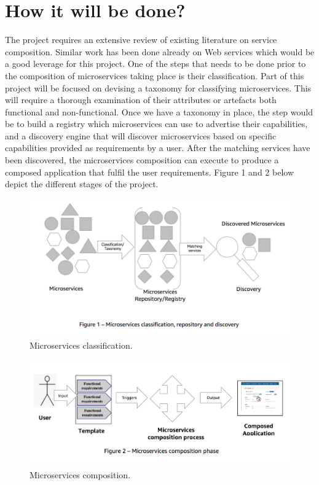 \documentclass{article}
\begin{document}
\section{How it will be done?}

The project requires an extensive review of existing literature on service composition. Similar work has been done already on Web services which would be a good leverage for this project. One of the steps that needs to be done prior to the composition of microservices taking place is their classification. Part of this project will be focused on devising a taxonomy for classifying microservices. This will require a thorough examination of their attributes or artefacts both functional and non-functional. Once we have a taxonomy in place, the step would be to build a registry which microservices can use to advertise their capabilities, and a discovery engine that will discover microservices based on specific capabilities provided as requirements by a user. After the matching services have been discovered, the microservices composition can execute to produce a composed application that fulfil the user requirements. Figure 1 and 2 below depict the different stages of the project.

\begin{figure}[!ht]
\includegraphics{microservices_classification.png}
\caption{Microservices classification.}
\end{figure}

\begin{figure}[!ht]
\includegraphics{microservices_composition.png}
\caption{Microservices composition.}
\end{figure}
\end{document}
